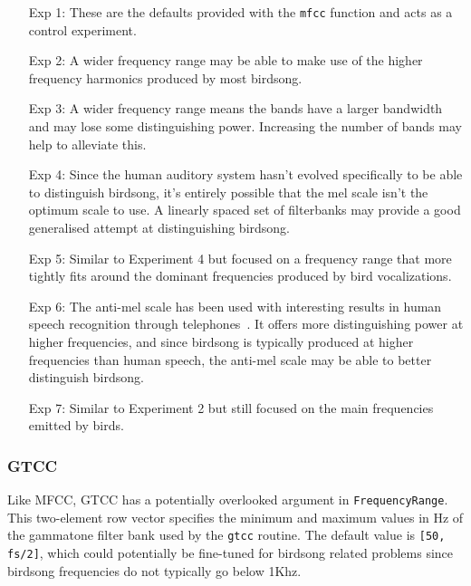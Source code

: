 \begin{itemize}

  \item [Exp 1:] These are the defaults provided with the \texttt{mfcc}
    function and acts as a control experiment.

  \item [Exp 2:] A wider frequency range may be able to make use of the
    higher frequency harmonics produced by most birdsong.

  \item [Exp 3:] A wider frequency range means the bands have a larger bandwidth
    and may lose some distinguishing power. Increasing the number of bands may
    help to alleviate this.

  \item [Exp 4:] Since the human auditory system hasn't evolved specifically to be
    able to distinguish birdsong, it's entirely possible that the mel scale
    isn't the optimum scale to use. A linearly spaced set of filterbanks may
    provide a good generalised attempt at distinguishing birdsong.

  \item [Exp 5:] Similar to Experiment 4 but focused on a frequency range that
    more tightly fits around the dominant frequencies produced by bird
    vocalizations.

  \item [Exp 6:] The anti-mel scale has been used with interesting results in
    human speech recognition through telephones~\cite{lei2009mel}. It offers
    more distinguishing power at higher frequencies, and since birdsong is
    typically produced at higher frequencies than human speech, the anti-mel
    scale may be able to better distinguish birdsong.

  \item [Exp 7:] Similar to Experiment 2 but still focused on the main
    frequencies emitted by birds.

\end{itemize}

\subsubsection{GTCC}\label{sssec:gtcc}

Like MFCC, GTCC has a potentially overlooked argument in
\texttt{FrequencyRange}. This two-element row vector specifies the minimum and
maximum values in Hz of the gammatone filter bank used by the \texttt{gtcc}
routine. The default value is \texttt{[50, fs/2]}, which could potentially be
fine-tuned for birdsong related problems since birdsong frequencies do not
typically go below 1Khz.

